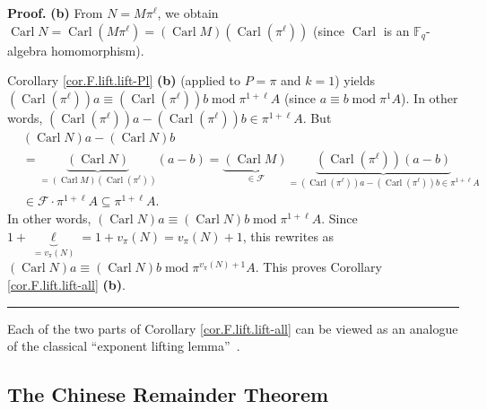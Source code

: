\documentclass[numbers=enddot,12pt,final,onecolumn,notitlepage]{scrartcl}%
\theoremstyle{definition}
\newenvironment{proof}[1][Proof]{\noindent\textbf{#1.} }{\ \rule{0.5em}{0.5em}}
\begin{document}
\begin{proof}
\textbf{(b)} From $N=M\pi^{\ell}$, we obtain $\operatorname*{Carl}%
N=\operatorname*{Carl}\left(  M\pi^{\ell}\right)  =\left(
\operatorname*{Carl}M\right)  \left(  \operatorname*{Carl}\left(  \pi^{\ell
}\right)  \right)  $ (since $\operatorname*{Carl}$ is an $\mathbb{F}_{q}%
$-algebra homomorphism).

Corollary \ref{cor.F.lift.lift-Pl} \textbf{(b)} (applied to $P=\pi$ and $k=1$)
yields $\left(  \operatorname*{Carl}\left(  \pi^{\ell}\right)  \right)
a\equiv\left(  \operatorname*{Carl}\left(  \pi^{\ell}\right)  \right)
b\operatorname{mod}\pi^{1+\ell}A$ (since $a\equiv b\operatorname{mod}\pi^{1}%
A$). In other words, $\left(  \operatorname*{Carl}\left(  \pi^{\ell}\right)
\right)  a-\left(  \operatorname*{Carl}\left(  \pi^{\ell}\right)  \right)
b\in\pi^{1+\ell}A$. But%
\begin{align*}
&  \left(  \operatorname*{Carl}N\right)  a-\left(  \operatorname*{Carl}%
N\right)  b\\
&  =\underbrace{\left(  \operatorname*{Carl}N\right)  }_{=\left(
\operatorname*{Carl}M\right)  \left(  \operatorname*{Carl}\left(  \pi^{\ell
}\right)  \right)  }\left(  a-b\right)  =\underbrace{\left(
\operatorname*{Carl}M\right)  }_{\in\mathcal{F}}\underbrace{\left(
\operatorname*{Carl}\left(  \pi^{\ell}\right)  \right)  \left(  a-b\right)
}_{=\left(  \operatorname*{Carl}\left(  \pi^{\ell}\right)  \right)  a-\left(
\operatorname*{Carl}\left(  \pi^{\ell}\right)  \right)  b\in\pi^{1+\ell}A}\\
&  \in\mathcal{F}\cdot\pi^{1+\ell}A\subseteq\pi^{1+\ell}A.
\end{align*}
In other words, $\left(  \operatorname*{Carl}N\right)  a\equiv\left(
\operatorname*{Carl}N\right)  b\operatorname{mod}\pi^{1+\ell}A$. Since
$1+\underbrace{\ell}_{=v_{\pi}\left(  N\right)  }=1+v_{\pi}\left(  N\right)
=v_{\pi}\left(  N\right)  +1$, this rewrites as $\left(  \operatorname*{Carl}%
N\right)  a\equiv\left(  \operatorname*{Carl}N\right)  b\operatorname{mod}%
\pi^{v_{\pi}\left(  N\right)  +1}A$. This proves Corollary
\ref{cor.F.lift.lift-all} \textbf{(b)}.
\end{proof}

Each of the two parts of Corollary \ref{cor.F.lift.lift-all} can be viewed as
an analogue of the classical \textquotedblleft exponent lifting
lemma\textquotedblright\ \cite[version with solution (ancillary file),
(12.349)]{reiner-hopf}.

\subsection{The Chinese Remainder Theorem}
\end{document}
